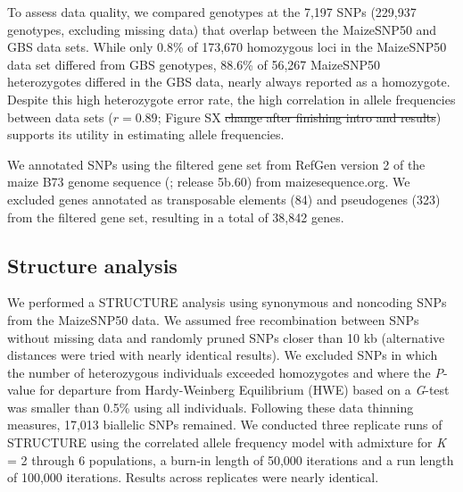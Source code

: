 To assess data quality, we compared genotypes at the 7,197 SNPs (229,937 genotypes, excluding missing data) that overlap between the MaizeSNP50 and GBS data sets. 
While only 0.8\% of 173,670 homozygous loci in the MaizeSNP50 data set differed from GBS genotypes, 88.6\% of 56,267 MaizeSNP50 heterozygotes differed in the GBS data, nearly always reported as a homozygote.
Despite this high heterozygote error rate,  the high correlation in allele frequencies between data sets ($r=0.89$; Figure SX  \st{change after finishing intro and results}) supports its utility in estimating allele frequencies.  

We annotated SNPs using the filtered gene set from RefGen version 2 of the maize B73 genome sequence (\citealt{Schnable_2009_19965430}; release 5b.60) from maizesequence.org.  
We excluded genes annotated as transposable elements (84) and pseudogenes (323) from the filtered gene set, resulting in a total of 38,842 genes.

\subsection*{Structure analysis}
We performed a {\sf STRUCTURE} analysis \cite[]{Pritchard_2000_10835412,Falush_2003_12930761} using  synonymous and noncoding SNPs from the MaizeSNP50 data. 
We assumed free recombination between SNPs without missing data and randomly pruned SNPs closer than 10 kb (alternative distances were tried with nearly identical results). 
We excluded SNPs in which the number of heterozygous individuals exceeded homozygotes and where the \emph{P}-value for departure from Hardy-Weinberg Equilibrium (HWE) based on a \emph{G}-test was smaller than 0.5\% using all individuals. 
Following these data thinning measures, 17,013 biallelic SNPs remained. 
We conducted three replicate runs of {\sf STRUCTURE} using the correlated allele frequency model with admixture for \emph{K} = 2 through 6 populations, a burn-in length of 50,000 iterations and a run length of 100,000 iterations. 
Results across replicates were nearly identical.

